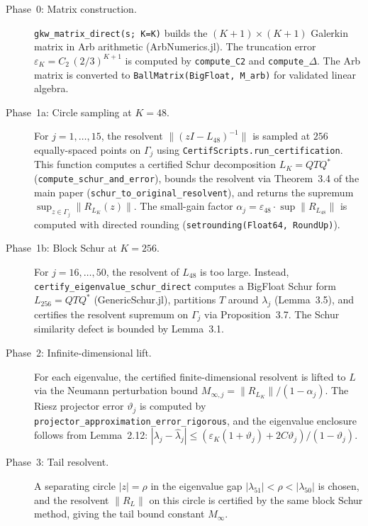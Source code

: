 \documentclass[11pt]{article}
\begin{document}
\begin{description}
\item[Phase~0: Matrix construction.]
  \texttt{gkw\_matrix\_direct(s; K=K)} builds the $(K{+}1)\times(K{+}1)$
  Galerkin matrix in Arb arithmetic (ArbNumerics.jl).
  The truncation error $\varepsilon_K = C_2\,(2/3)^{K+1}$ is computed by
  \texttt{compute\_C2} and \texttt{compute\_\(\Delta\)}.
  The Arb matrix is converted to \texttt{BallMatrix(BigFloat, M\_arb)}
  for validated linear algebra.

\item[Phase~1a: Circle sampling at $K = 48$.]
  For $j = 1, \ldots, 15$, the resolvent $\|(zI - L_{48})^{-1}\|$
  is sampled at $256$ equally-spaced points on $\Gamma_j$ using
  \texttt{CertifScripts.run\_certification}.
  This function computes a certified Schur decomposition $L_K = QTQ^*$
  (\texttt{compute\_schur\_and\_error}),
  bounds the resolvent via
  Theorem~3.4 of the main paper
  (\texttt{schur\_to\_original\_resolvent}),
  and returns the supremum $\sup_{z\in\Gamma_j}\|R_{L_K}(z)\|$.
  The small-gain factor $\alpha_j = \varepsilon_{48}\cdot\sup\|R_{L_{48}}\|$
  is computed with directed rounding (\texttt{setrounding(Float64, RoundUp)}).

\item[Phase~1b: Block Schur at $K = 256$.]
  For $j = 16, \ldots, 50$, the resolvent of $L_{48}$ is too large.
  Instead, \texttt{certify\_eigenvalue\_schur\_direct}
  computes a BigFloat Schur form $L_{256} = QTQ^*$ (GenericSchur.jl),
  partitions $T$ around $\lambda_j$ (Lemma~3.5),
  and certifies the resolvent supremum on $\Gamma_j$
  via Proposition~3.7.
  The Schur similarity defect is bounded by
  Lemma~3.1.

\item[Phase~2: Infinite-dimensional lift.]
  For each eigenvalue, the certified finite-dimensional resolvent
  is lifted to $L$ via the Neumann perturbation bound
  $M_{\infty,j} = \|R_{L_K}\|/(1 - \alpha_j)$.
  The Riesz projector error $\vartheta_j$ is computed by
  \texttt{projector\_approximation\_error\_rigorous},
  and the eigenvalue enclosure follows from
  Lemma~2.12:
  $|\lambda_j - \hat\lambda_j| \leq
   (\varepsilon_K(1{+}\vartheta_j) + 2C\vartheta_j)/(1{-}\vartheta_j)$.

\item[Phase~3: Tail resolvent.]
  A separating circle $|z| = \rho$ in the eigenvalue gap
  $|\lambda_{51}| < \rho < |\lambda_{50}|$ is chosen, and the resolvent
  $\|R_L\|$ on this circle is certified by the same block Schur
  method, giving the tail bound constant $M_\infty$.
\end{description}
\end{document}
